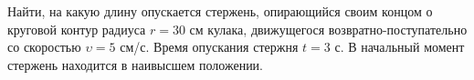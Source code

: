 Найти, на какую длину опускается стержень,
опирающийся своим концом о круговой контур радиуса $r = 30$ см
кулака, движущегося возвратно-поступательно со скоростью $\upsilon = 5$ см/с.
Время опускания стержня $t = 3$ с.
В начальный момент стержень находится в наивысшем положении.
